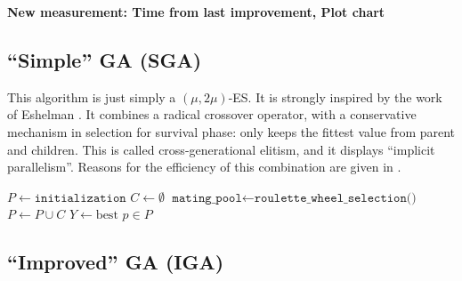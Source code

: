 \documentclass[runningheads]{llncs}
\begin{document}
\textbf{New measurement: Time from last improvement, Plot chart}

\subsection{``Simple'' GA (SGA)} \label{SGA}
This algorithm is just simply a $(\mu, 2\mu)$-ES. It is strongly inspired by the work of Eshelman \cite{eshelman1991chc}. It combines a radical crossover operator, with a conservative mechanism in selection for survival phase: only keeps the fittest value from parent and children. This is called cross-generational elitism, and it displays ``implicit parallelism''. Reasons for the efficiency of this combination are given in \cite{eshelman1991chc}.

\begin{algorithm}[htb]
    \caption{\texttt{SGA} -- Simple Genetic Algorithm}\label{alg:sga}
    $P \gets \texttt{initialization}$\;
     {
        $C \gets \emptyset$\;
        $\texttt{mating\_pool} \gets \texttt{roulette\_wheel\_selection()}$\;
        $P \gets P \cup C$\;
    }
    $Y \gets \text{best } p\in P$
\end{algorithm}

\subsection{``Improved'' GA (IGA)} \label{IGA}
\end{document}

